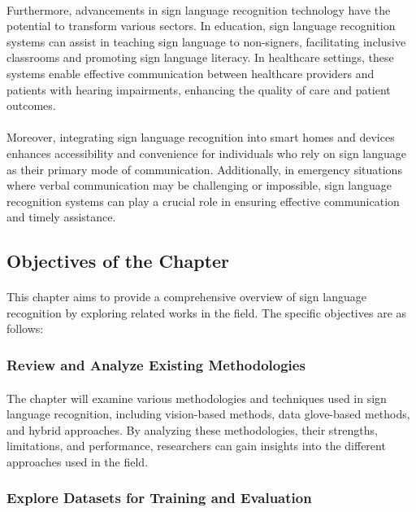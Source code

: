\paragraph{}
Furthermore, advancements in sign language recognition technology have the potential to transform various sectors. In education, sign language recognition systems can assist in teaching sign language to non-signers, facilitating inclusive classrooms and promoting sign language literacy. In healthcare settings, these systems enable effective communication between healthcare providers and patients with hearing impairments, enhancing the quality of care and patient outcomes.
\paragraph{}
Moreover, integrating sign language recognition into smart homes and devices enhances accessibility and convenience for individuals who rely on sign language as their primary mode of communication. Additionally, in emergency situations where verbal communication may be challenging or impossible, sign language recognition systems can play a crucial role in ensuring effective communication and timely assistance.
\subsection{Objectives of the Chapter}
\paragraph{}
This chapter aims to provide a comprehensive overview of sign language recognition by exploring related works in the field. The specific objectives are as follows:
\subsubsection{Review and Analyze Existing Methodologies}
\paragraph{}
The chapter will examine various methodologies and techniques used in sign language recognition, including vision-based methods, data glove-based methods, and hybrid approaches. By analyzing these methodologies, their strengths, limitations, and performance, researchers can gain insights into the different approaches used in the field.
\subsubsection{Explore Datasets for Training and Evaluation}
